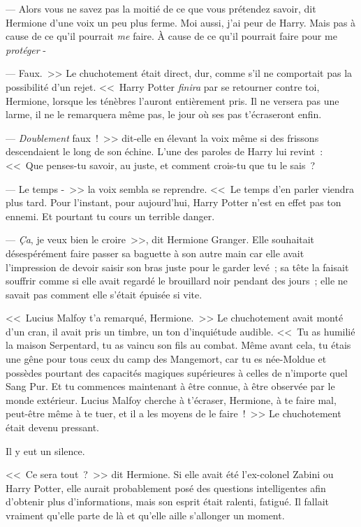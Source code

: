 --- Alors vous ne savez pas la moitié de ce que vous prétendez savoir, dit Hermione d'une voix un peu plus ferme. Moi aussi, j'ai peur de Harry. Mais pas à cause de ce qu'il pourrait \emph{me} faire. À cause de ce qu'il pourrait faire pour me \emph{protéger} -

--- Faux.~>> Le chuchotement était direct, dur, comme s'il ne comportait pas la possibilité d'un rejet. <<~Harry Potter \emph{finira} par se retourner contre toi, Hermione, lorsque les ténèbres l'auront entièrement pris. Il ne versera pas une larme, il ne le remarquera même pas, le jour où ses pas t'écraseront enfin.

--- \emph{Doublement} faux~!~>> dit-elle en élevant la voix même si des frissons descendaient le long de son échine. L'une des paroles de Harry lui revint~: <<~Que penses-tu savoir, au juste, et comment crois-tu que tu le sais~?

--- Le temps -~>> la voix sembla se reprendre. <<~Le temps d'en parler viendra plus tard. Pour l'instant, pour aujourd'hui, Harry Potter n'est en effet pas ton ennemi. Et pourtant tu cours un terrible danger.

--- \emph{Ça}, je veux bien le croire~>>, dit Hermione Granger. Elle souhaitait désespérément faire passer sa baguette à son autre main car elle avait l'impression de devoir saisir son bras juste pour le garder levé~; sa tête la faisait souffrir comme si elle avait regardé le brouillard noir pendant des jours~; elle ne savait pas comment elle s'était épuisée si vite.

<<~Lucius Malfoy t'a remarqué, Hermione.~>> Le chuchotement avait monté d'un cran, il avait pris un timbre, un ton d'inquiétude audible. <<~Tu as humilié la maison Serpentard, tu as vaincu son fils au combat. Même avant cela, tu étais une gêne pour tous ceux du camp des Mangemort, car tu es née-Moldue et possèdes pourtant des capacités magiques supérieures à celles de n'importe quel Sang Pur. Et tu commences maintenant à être connue, à être observée par le monde extérieur. Lucius Malfoy cherche à t'écraser, Hermione, à te faire mal, peut-être même à te tuer, et il a les moyens de le faire~!~>> Le chuchotement était devenu pressant.

Il y eut un silence.

<<~Ce sera tout~?~>> dit Hermione. Si elle avait été l'ex-colonel Zabini ou Harry Potter, elle aurait probablement posé des questions intelligentes afin d'obtenir plus d'informations, mais son esprit était ralenti, fatigué. Il fallait vraiment qu'elle parte de là et qu'elle aille s'allonger un moment.

